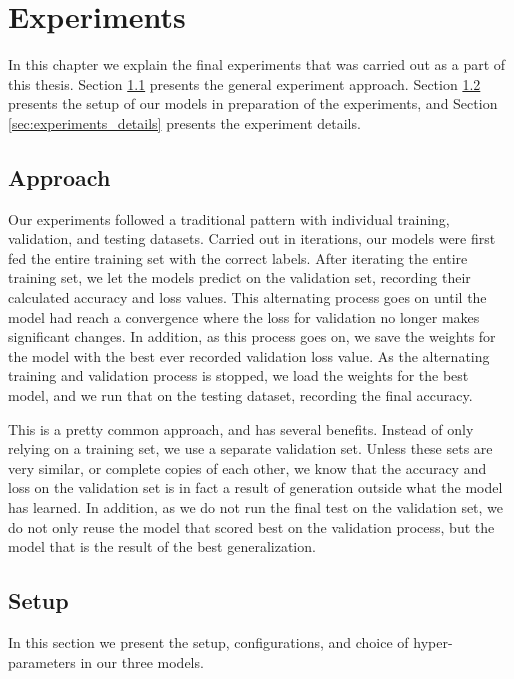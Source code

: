 
\chapter{Experiments}
\label{ch:experiments}
In this chapter we explain the final experiments that was carried out as a part of this thesis. Section \ref{sec:approach} presents the general experiment approach. Section \ref{sec:setup} presents the setup of our models in preparation of the experiments, and Section \ref{sec:experiments_details} presents the experiment details.


\section{Approach}
\label{sec:approach}
Our experiments followed a traditional pattern with individual training, validation, and testing datasets. Carried out in iterations, our models were first fed the entire training set with the correct labels. After iterating the entire training set, we let the models predict on the validation set, recording their calculated accuracy and loss values. This alternating process goes on until the model had reach a convergence where the loss for validation no longer makes significant changes. In addition, as this process goes on, we save the weights for the model with the best ever recorded validation loss value. As the alternating training and validation process is stopped, we load the weights for the best model, and we run that on the testing dataset, recording the final accuracy.

This is a pretty common approach, and has several benefits. Instead of only relying on a training set, we use a separate validation set. Unless these sets are very similar, or complete copies of each other, we know that the accuracy and loss on the validation set is in fact a result of generation outside what the model has learned. In addition, as we do not run the final test on the validation set, we do not only reuse the model that scored best on the validation process, but the model that is the result of the best generalization.


\section{Setup}
\label{sec:setup}
In this section we present the setup, configurations, and choice of hyper-parameters in our three models. 

